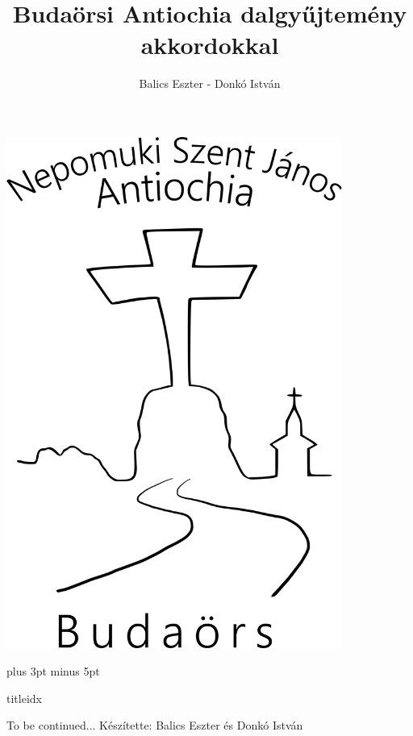 \documentclass[a5paper,twoside]{article}
\title{Budaörsi Antiochia dalgyűjtemény akkordokkal}
\author{Balics Eszter - Donkó István}
\begin{document}
  \begin{titlepage}
    \setlength{\oddsidemargin}{-1.3cm}

    \vspace*{0.75cm}
    \includegraphics[width=11cm]{Logo_07_final}

    \thispagestyle{empty}
  \end{titlepage}


  \versesep=12pt plus 3pt minus 5pt

  \begin{songs}{titleidx}
    
  \end{songs}

  \newpage
  \thispagestyle{empty}

  To be continued...
  \vfill
  Készítette: Balics Eszter és Donkó István
\end{document}
